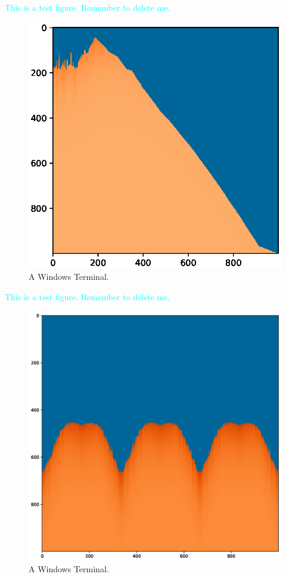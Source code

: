\documentclass[12pt]{article}
\begin{document}
\textcolor{cyan}{This is a test figure. Remember to delete me.}
\begin{figure}[H]
    \includegraphics[width=\linewidth]{Figure_1.eps}
    \caption{A Windows Terminal.}
    \label{fig:Terminal}
\end{figure}
\textcolor{cyan}{This is a test figure. Remember to delete me.}
\begin{figure}[H]
    \includegraphics[width=\linewidth]{Figure_2.eps}
    \caption{A Windows Terminal.}
    \label{fig:Terminal}
\end{figure}
\end{document}
